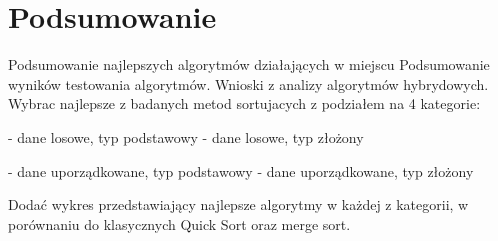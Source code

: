 \chapter{Podsumowanie}
\thispagestyle{chapterBeginStyle}

Podsumowanie najlepszych algorytmów działających w miejscu
Podsumowanie wyników testowania algorytmów. Wnioski z analizy algorytmów hybrydowych.
Wybrac najlepsze z badanych metod sortujacych z podziałem na 4 kategorie:

- dane losowe, typ podstawowy
- dane losowe, typ złożony

- dane uporządkowane, typ podstawowy
- dane uporządkowane, typ złożony

Dodać wykres przedstawiający najlepsze algorytmy w każdej z kategorii, w porównaniu do klasycznych Quick Sort oraz merge sort.
